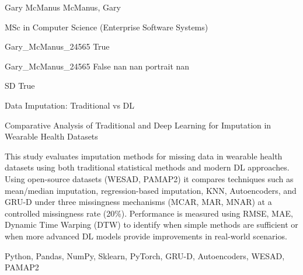 \documentclass[twoside]{report}
\begin{document}
\begingroup{}\relax



\def\Key{Gary_McManus_24565}

{Gary McManus}
{McManus, Gary}

{MSc in Computer Science (Enterprise Software Systems)}

{Gary_McManus_24565}
{True}

{Gary_McManus_24565}
{False}
{nan}
{nan}
{portrait}
{nan}

{SD}
{True}

{Data Imputation: Traditional vs DL}

{Comparative Analysis of Traditional and Deep Learning for Imputation in Wearable Health Datasets}

{This study evaluates imputation methods for missing data in wearable health datasets using both traditional statistical methods and modern DL approaches. Using open-source datasets (WESAD, PAMAP2) it compares techniques such as mean/median imputation, regression-based imputation, KNN, Autoencoders, and GRU-D under three missingness mechanisms (MCAR, MAR, MNAR) at a controlled missingness rate (20\%). Performance is measured using RMSE, MAE, Dynamic Time Warping (DTW) to identify when simple methods are sufficient or when more advanced DL models provide improvements in real-world scenarios.}

{Python, Pandas, NumPy, Sklearn, PyTorch, GRU-D, Autoencoders, WESAD, PAMAP2}
\end{document}
